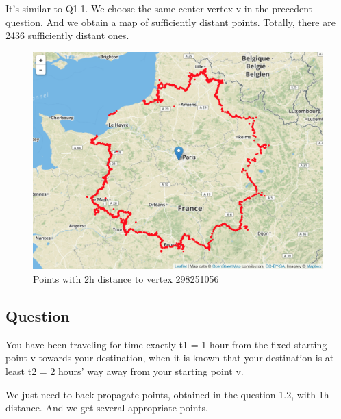 \documentclass[titlepage,11pt,a4paper]{article}
\begin{document}
It's similar to Q1.1. We choose the same center vertex v in the precedent question. And we obtain a map of sufficiently distant points. Totally, there are 2436 sufficiently distant ones.

\begin{figure}[h]
    \centering
    \includegraphics[width=\textwidth]{map_Q1.2.png}
    \caption{Points with 2h distance to vertex 298251056}
    \label{fig:questioin_1.2_out}
\end{figure}

\subsection{Question}{You have been traveling for time exactly t1 = 1 hour from the fixed starting point v towards your destination, when it is known that your destination is at least t2 = 2 hours' way away from your starting point v.}

We just need to back propagate points, obtained in the question 1.2, with 1h distance. And we get several appropriate points.

\newpage
\end{document}
